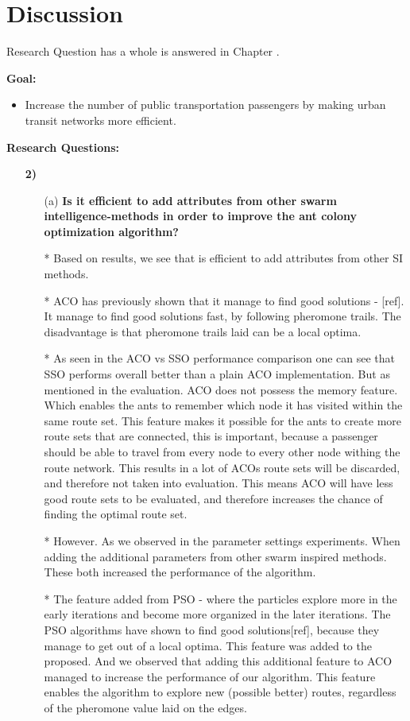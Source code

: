 \section{Discussion}
Research Question \label{itm:1} has a whole is answered in Chapter \label{relatedWork}.

\textbf{Goal:}
\begin{itemize}
\item  Increase the number of public transportation passengers by making urban transit networks more efficient.
\end{itemize}

\textbf{Research Questions:}
\begin{enumerate}[label=\textbf{\arabic*})]
\item[\textbf{2)}]
    \begin{enumerate}

    \item[(a)]  \textbf{Is it efficient to add attributes from other swarm intelligence-methods in order to improve the ant colony optimization algorithm?}

    * Based on results, we see that is efficient to add attributes from other SI methods. 

    * ACO has previously shown that it manage to find good solutions - [ref]. It manage to find good solutions fast, by following pheromone trails. The disadvantage is that pheromone trails laid can be a local optima.
    
    * As seen in the ACO vs SSO performance comparison one can see that SSO performs overall better than a plain ACO implementation. But as mentioned in the evaluation. ACO does not possess the memory feature. Which enables the ants to remember which node it has visited within the same route set. This feature makes it possible for the ants to create more route sets that are connected, this is important, because a passenger should be able to travel from every node to every other node withing the route network. This results in a lot of ACOs route sets will be discarded, and therefore not taken into evaluation. This means ACO will have less good route sets to be evaluated, and therefore increases the chance of finding the optimal route set. 

    * However. As we observed in the parameter settings experiments. When adding the additional parameters from other swarm inspired methods. These both increased the performance of the algorithm. 

    * The feature added from PSO - where the particles explore more in the early iterations and become more organized in the later iterations. The PSO algorithms have shown to find good solutions[ref], because they manage to get out of a local optima. This feature was added to the proposed. And we observed that adding this additional feature to ACO managed to increase the performance of our algorithm. This feature enables the algorithm to explore new (possible better) routes, regardless of the pheromone value laid on the edges.


\end{enumerate}
\end{enumerate}
